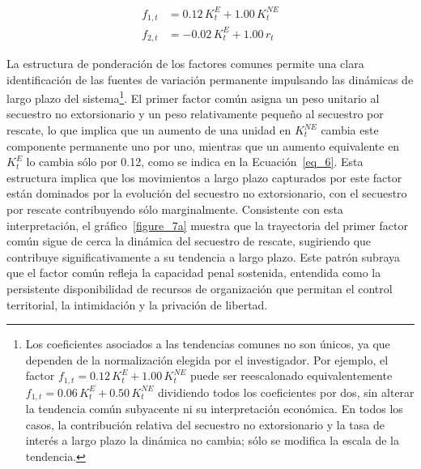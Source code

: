 \documentclass[12pt]{article}
\theoremstyle{definition}
\theoremstyle{remark}
\newcommand{\1}{\mathbf{1}}
\begin{document}
\begin{align}
    f_{1,t} &= 0.12\,K^{E}_t + 1.00\,K^{NE}_t
    \label{eq_6} \\
    f_{2,t} &= -0.02\,K^{E}_t + 1.00\,r_t
    \label{eq_7}
\end{align}


La estructura de ponderación de los factores comunes permite una clara identificación de las fuentes de variación permanente impulsando las dinámicas de largo plazo del sistema\footnote{Los coeficientes asociados a las tendencias comunes no son únicos, ya que dependen de la normalización elegida por el investigador. Por ejemplo, el factor \(f_{1,t} = 0.12\,K^{E}_t + 1.00\,K^{NE}_t\) puede ser reescalonado equivalentemente \(f_{1,t} = 0.06\,K^{E}_t + 0.50\,K^{NE}_t\) dividiendo todos los coeficientes por dos, sin alterar la tendencia común subyacente ni su interpretación económica. En todos los casos, la contribución relativa del secuestro no extorsionario y la tasa de interés a largo plazo la dinámica no cambia; sólo se modifica la escala de la tendencia.}. El primer factor común asigna un peso unitario al secuestro no extorsionario y un peso relativamente pequeño al secuestro por rescate, lo que implica que un aumento de una unidad en \(K^{NE}_t\) cambia este componente permanente uno por uno, mientras que un aumento equivalente en \(K^{E}_t\) lo cambia sólo por 0.12, como se indica en la Ecuación~\ref{eq_6}. Esta estructura implica que los movimientos a largo plazo capturados por este factor están dominados por la evolución del secuestro no extorsionario, con el secuestro por rescate contribuyendo sólo marginalmente. Consistente con esta interpretación, el gráfico~\ref{figure_7a} muestra que la trayectoria del primer factor común sigue de cerca la dinámica del secuestro de rescate, sugiriendo que contribuye significativamente a su tendencia a largo plazo. Este patrón subraya que el factor común refleja la capacidad penal sostenida, entendida como la persistente disponibilidad de recursos de organización que permitan el control territorial, la intimidación y la privación de libertad.
\end{document}
